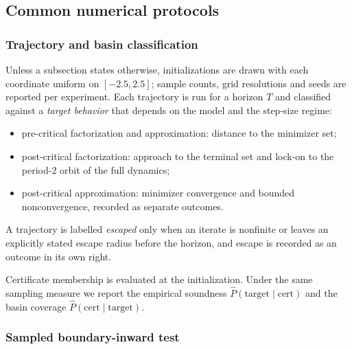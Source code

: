 \documentclass{article}
\begin{document}
\subsection{Common numerical protocols}
\label{apx:numerical_protocols}

\subsubsection{Trajectory and basin classification}
\label{apx:trajectory_protocol}

Unless a subsection states otherwise, initializations are drawn with each
coordinate uniform on $[-2.5,2.5]$; sample counts, grid resolutions and seeds
are reported per experiment. Each trajectory is run for a horizon $T$ and
classified against a \emph{target behavior} that depends on the model and the
step-size regime:

\begin{itemize}
    \item pre-critical factorization and approximation: distance to the
    minimizer set;
    \item post-critical factorization: approach to the terminal set and
    lock-on to the period-$2$ orbit of the full dynamics;
    \item post-critical approximation: minimizer convergence and bounded
    nonconvergence, recorded as separate outcomes.
\end{itemize}

A trajectory is labelled \emph{escaped} only when an iterate is nonfinite or
leaves an explicitly stated escape radius before the horizon, and escape is
recorded as an outcome in its own right.

Certificate membership is evaluated at the initialization. Under the same
sampling measure we report the empirical soundness
$\widehat P(\text{target}\mid\text{cert})$ and the basin coverage
$\widehat P(\text{cert}\mid\text{target})$.

\subsubsection{Sampled boundary-inward test}
\label{apx:a5_protocol}
\end{document}
